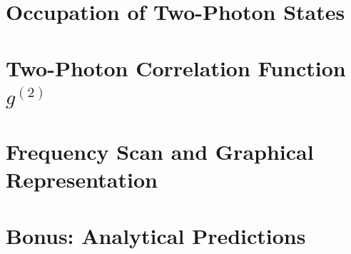 \documentclass[12pt,a4paper]{article}
\begin{document}
\section{Occupation of Two-Photon States}

\section{Two-Photon Correlation Function $g^{(2)}$}

\section{Frequency Scan and Graphical Representation}

\section{Bonus: Analytical Predictions}

%
\end{document}
